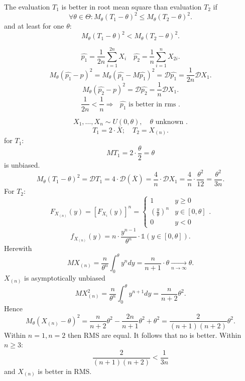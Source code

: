 \begin{definition}
    The evaluation $T_1$ is better in root mean
    square than evaluation $T_2$ if \[
    \forall \theta \in \Theta : M_{\theta} (T_1 - \theta)^2 \leq 
    M_{\theta} \left( T_2 - \theta \right) ^2
    .\]  and at least for one $\theta$: \[
    M_{\theta}\left( T_1 - \theta \right) ^2 <
    M_{\theta} \left(T_2 - \theta  \right) ^2
    .\] 
\end{definition}

\begin{example}[continuation]
    \[
    \hat{p_1} = \frac{1}{2n} \sum_{i=1}^{2n} X_i \quad
    \hat{p_2} = \frac{1}{n} \sum_{i=1}^{n} X_{2i}
    .\] 
    \[
     M_{\theta}\left( \hat{p_1} - p \right) ^2 =
     M_{\theta} \left( \hat{p_1} - M\hat{p_1} \right) ^2 =
     \mathcal{D} \hat{p_1} = \frac{1}{2n} \mathcal{D}X_1
    .\]  
    \[
    M_{\theta} \left( \hat{p_2} - p \right) ^2 = 
    \mathcal{D} \hat{p_2} = \frac{1}{n} \mathcal{D} X_1
    .\]
    \[
    \frac{1}{2n} < \frac{1}{n} \Rightarrow \text{ $\hat{p_1}$ is better in rms }
    .\] 
\end{example}

\begin{example}
    \[
    X_1, \ldots, X_n \sim  U(0, \theta), \quad
    \text{$\theta$ unknown }
    .\] 
    \[
    T_1 = 2 \cdot \overline{X} ; \quad
    T_2 = X_{\left( n \right) }
    .\] 
    for $T_1$:
    \[
    MT_1 = 2 \cdot \frac{\theta}{2} = \theta
    \]  is unbiased.
    \[
    M_{\theta} (T_1 - \theta)^2 = \mathcal{D} T_1 =
    4 \cdot \mathcal{D} (\overline{X})
    = \frac{4}{n} \cdot \mathcal{D} X_1 =
    \frac{4}{n} \cdot \frac{\theta^2}{12} = \frac{\theta^2}{3n}
    .\] 
    For $T_2$:
    \[
    F_{X_{(n)}} (y) = \left[ F_{X_i}(y) \right] ^{n} =
    \begin{cases}
        1 & y \geq 0 \\
        \left( \frac{y}{\theta} \right) ^{n} & y \in [0, \theta] \\
        0 & y < 0
    \end{cases}
    .\] 
    \[
    f_{X_{(n)}} (y) = n \cdot \frac{y^{n-1}}{\theta^n}
    \cdot \mathds{1}(y \in [0, \theta])
    .\] 
    Herewith
    \[
    MX_{(n)} = \frac{n}{\theta^{n}} \int_{0}^{\theta} y^n dy =
    \frac{n}{n+1} \cdot \theta \underset{n\to\infty}{\to} \theta
    .\] 
    $X_{(n)}$ is asymptotically unbiased
    \[
    MX_{(n)}^2 = \frac{n}{\theta^{n}} \int_{0}^{\theta} y^{n+1} dy =
    \frac{n}{n+2} \theta^2
    .\] 
    Hence
    \[
    M_{\theta} \left( X_{\left( n \right) } - \theta \right) ^2 =
    \frac{n}{n+2}\theta^2 - \frac{2n}{n+1}\theta^2 + \theta ^2 =
    \frac{2}{(n+1)(n+2)}\theta^2
    .\]
    Within $n=1, n=2$ then RMS are equal.
    It follows that no is better.
    Within $n \geq 3$:
    \[
    \frac{2}{(n+1)(n+2)} < \frac{1}{3n}
    \] and $X_{(n)}$ is better in RMS.
\end{example}


